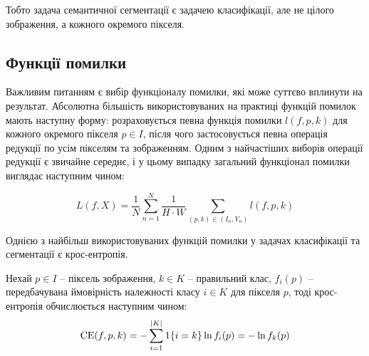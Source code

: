 Тобто задача семантичної сегментації є задачею класифікації, але
не цілого зображення, а кожного окремого пікселя.



\subsection{Функції помилки}

Важливим питанням є вибір функціоналу помилки, які може суттєво вплинути
на результат. Абсолютна більшість використовуваних на практиці
функцій помилок мають наступну форму: розраховується
певна функція помилки $l(f, p, k)$ для кожного окремого
пікселя $p \in I$, після чого застосовується певна операція редукції
по усім пікселям та зображенням. Одним з найчастіших
виборів операції редукції є звичайне середнє, і у цьому випадку
загальний функціонал помилки виглядає наступним чином:

\begin{equation} \label{eq:loss_reduction}
    L(f, X) = \frac{1}{N}
    \sum\limits_{n=1}^{N}
    \frac{1}{H \cdot W}
    \sum\limits_{(p, k) \in (I_n, Y_n)} l(f, p, k)
\end{equation}

Однією з найбільш використовуваних функцій помилки у задачах
класифікації та сегментації є крос-ентропія.

\begin{definition}\label{def:ce_loss}
    Нехай $p \in I$ -- піксель зображення, $k \in K$ -- правильний клас,
    $f_i(p)$ -- передбачувана ймовірність належності класу $i \in K$ для пікселя $p$, тоді крос-ентропія
    обчислюється наступним чином:
    $$ \operatorname{CE}(f, p, k) = - \sum\limits_{i=1}^{|K|} \operatorname{1}\{i = k\} \ln f_i(p) = - \ln f_k(p) $$
\end{definition}

